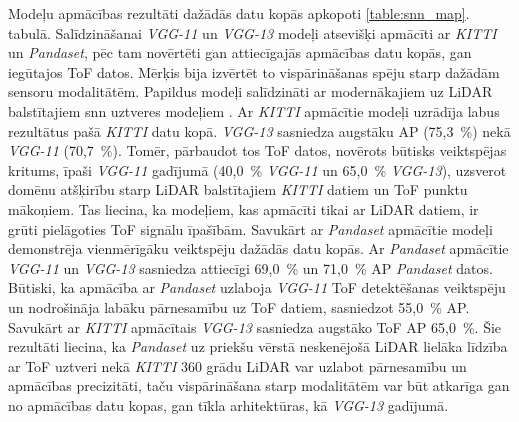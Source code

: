 Modeļu apmācības rezultāti dažādās datu kopās apkopoti \ref{table:snn_map}. tabulā. Salīdzināšanai \textit{VGG-11} un
\textit{VGG-13} modeļi atsevišķi apmācīti ar \textit{KITTI} un \textit{Pandaset}, pēc tam novērtēti gan attiecīgajās
apmācības datu kopās, gan iegūtajos ToF datos. Mērķis bija izvērtēt to vispārināšanas spēju starp dažādām sensoru
modalitātēm. Papildus modeļi salīdzināti ar modernākajiem uz LiDAR balstītajiem \Gls{snn} uztveres modeļiem \cite{Zhou2020,
qiu2024}. Ar \textit{KITTI} apmācītie modeļi uzrādīja labus rezultātus pašā \textit{KITTI} datu kopā. \textit{VGG-13}
sasniedza augstāku AP (75,3~\%) nekā \textit{VGG-11} (70,7~\%). Tomēr, pārbaudot tos ToF datos, novērots būtisks veiktspējas
kritums, īpaši \textit{VGG-11} gadījumā (40,0~\% \textit{VGG-11} un 65,0~\% \textit{VGG-13}), uzsverot domēnu atšķirību starp
LiDAR balstītajiem \textit{KITTI} datiem un ToF punktu mākoņiem. Tas liecina, ka modeļiem, kas apmācīti tikai ar LiDAR
datiem, ir grūti pielāgoties ToF signālu īpašībām. Savukārt ar \textit{Pandaset} apmācītie modeļi demonstrēja vienmērīgāku
veiktspēju dažādās datu kopās. Ar \textit{Pandaset} apmācītie \textit{VGG-11} un \textit{VGG-13} sasniedza attiecīgi 69,0~\%
un 71,0~\% AP \textit{Pandaset} datos. Būtiski, ka apmācība ar \textit{Pandaset} uzlaboja \textit{VGG-11} ToF detektēšanas
veiktspēju un nodrošināja labāku pārnesamību uz ToF datiem, sasniedzot 55,0~\% AP. Savukārt ar \textit{KITTI} apmācītais
\textit{VGG-13} sasniedza augstāko ToF AP 65,0~\%. Šie rezultāti liecina, ka \textit{Pandaset} uz priekšu vērstā
neskenējošā LiDAR lielāka līdzība ar ToF uztveri nekā \textit{KITTI} 360 grādu LiDAR var uzlabot pārnesamību un apmācības
precizitāti, taču vispārināšana starp modalitātēm var būt atkarīga gan no apmācības datu kopas, gan tīkla arhitektūras, kā
\textit{VGG-13} gadījumā.

